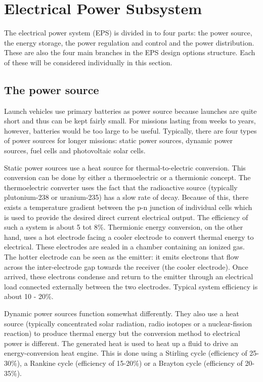 \section{Electrical Power Subsystem}
\label{blDOEPS}

The electrical power system (EPS) is divided in to four parts: the power source, the energy storage, the power regulation and control and the power distribution. These are also the four main branches in the EPS design options structure. Each of these will be considered individually in this section.

\subsection{The power source}
\label{blDOsource}

Launch vehicles use primary batteries as power source because launches are quite short and thus can be kept fairly small. 
For missions lasting from weeks to years, however, batteries would be too large to be useful.
Typically, there are four types of power sources for longer missions: static power sources, dynamic power sources, fuel cells and photovoltaic solar cells.

Static power sources use a heat source for thermal-to-electric conversion. This conversion can be done by either a thermoelectric or a thermionic
concept. The thermoelectric converter uses the fact that the radioactive source (typically plutonium-238 or uranium-235) has a slow rate of decay.
Because of this, there exists a temperature gradient between the p-n junction of individual cells which is used to provide the desired direct current electrical output. The efficiency of such a system is about 5 tot 8\%.
Thermionic energy conversion, on the other hand, uses a hot electrode facing a cooler electrode to convert thermal energy to electrical.
These electrodes are sealed in a chamber containing an ionized gas. The hotter electrode can be seen as the emitter: it emits electrons that flow
across the inter-electrode gap towards the receiver (the cooler electrode). Once arrived, these electrons condense and return to the emitter through an electrical load connected externally between the two electrodes. Typical system efficiency is about 10 - 20\%.

Dynamic power sources function somewhat differently. They also use a heat source (typically concentrated solar radiation, radio isotopes or a nuclear-fission reaction) to produce thermal energy but the conversion method to electrical power is different. The generated heat is used to heat up a fluid to drive an energy-conversion heat engine. This is done using a Stirling cycle (efficiency of 25-30\%), a Rankine cycle (efficiency of 15-20\%) or a Brayton cycle (efficiency of 20-35\%).

